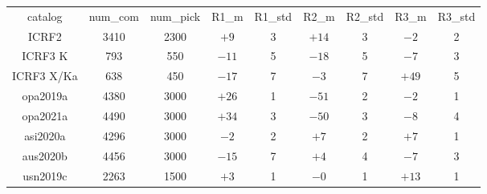 \begin{table}
\begin{tabular}{ccccccccc}
catalog & num_com & num_pick & R1_m & R1_std & R2_m & R2_std & R3_m & R3_std \\
ICRF2 & 3410 & 2300 & $  +9$ & 3 & $ +14$ & 3 & $  -2$ & 2 \\
ICRF3 K & 793 & 550 & $ -11$ & 5 & $ -18$ & 5 & $  -7$ & 3 \\
ICRF3 X/Ka & 638 & 450 & $ -17$ & 7 & $  -3$ & 7 & $ +49$ & 5 \\
opa2019a & 4380 & 3000 & $ +26$ & 1 & $ -51$ & 2 & $  -2$ & 1 \\
opa2021a & 4490 & 3000 & $ +34$ & 3 & $ -50$ & 3 & $  -8$ & 4 \\
asi2020a & 4296 & 3000 & $  -2$ & 2 & $  +7$ & 2 & $  +7$ & 1 \\
aus2020b & 4456 & 3000 & $ -15$ & 7 & $  +4$ & 4 & $  -7$ & 3 \\
usn2019c & 2263 & 1500 & $  +3$ & 1 & $  -0$ & 1 & $ +13$ & 1 \\
\end{tabular}
\end{table}
